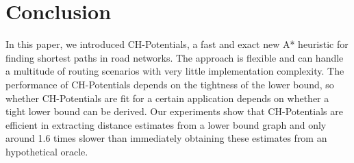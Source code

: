 \documentclass[letterpaper]{article} %
\begin{document}
\section{Conclusion}
\label{sec:conclusion}

In this paper, we introduced CH-Potentials, a fast and exact new A* heuristic for finding shortest paths in road networks.
The approach is flexible and can handle a multitude of routing scenarios with very little implementation complexity.
The performance of CH-Potentials depends on the tightness of the lower bound, so whether CH-Potentials are fit for a certain application depends on whether a tight lower bound can be derived.
Our experiments show that CH-Potentials are efficient in extracting distance estimates from a lower bound graph and only around 1.6 times slower than immediately obtaining these estimates from an hypothetical oracle.



\pagebreak



\end{document}
